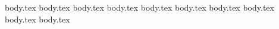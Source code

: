 \chapter{\fivesece{}}
{body.tex}
{body.tex}
{body.tex}
{body.tex}
{body.tex}
{body.tex}
{body.tex}
{body.tex}
{body.tex}
{body.tex}